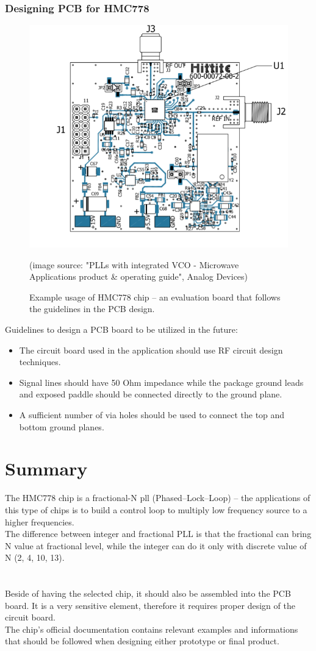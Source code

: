 \documentclass[eng,printmode]{mgr}
\begin{document}
\subsubsection{Designing PCB for HMC778}
\begin{figure}[!h]
	\centering
	\includegraphics[width=0.5\linewidth]{pll2}
	\label{fig:pll2}
	\caption{Example usage of HMC778 chip -- an evaluation board that follows the guidelines in the PCB design.}
	\hspace{20pt}
	(image source: "PLLs with integrated VCO - Microwave Applications
	product \& operating guide", Analog Devices)
\end{figure}
Guidelines to design a PCB board to be utilized in the future:
\begin{itemize}
	\item The circuit board used in the application should use RF circuit design techniques. 
	\item Signal lines should have
	50 Ohm impedance while the package ground leads and exposed paddle should be connected directly
	to the ground plane. 
	\item A sufficient number of via holes should be used to connect the
	top and bottom ground planes.
\end{itemize}
\section{Summary}
The HMC778 chip is a fractional-N pll (Phased--Lock--Loop) -- the applications of this type of chips is to build a control loop to multiply low frequency source to a higher frequencies.\\
The difference between integer and fractional PLL is that the fractional can bring N value at fractional level, while the integer can do it only with discrete value of N (2, 4, 10, 13).\\
\\
\\
Beside of having the selected chip, it should also be assembled into the PCB board. It is a very sensitive element, therefore it requires proper design of the circuit board.\\ The chip's official documentation contains relevant examples and informations that should be followed when designing either prototype or final product.
\end{document}
